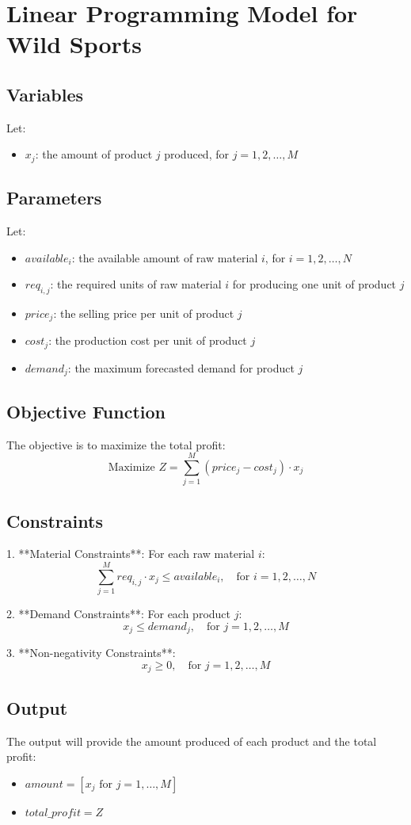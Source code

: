 \documentclass{article}
\begin{document}
\section*{Linear Programming Model for Wild Sports}

\subsection*{Variables}
Let:
\begin{itemize}
    \item \( x_j \): the amount of product \( j \) produced, for \( j = 1, 2, \ldots, M \)
\end{itemize}

\subsection*{Parameters}
Let:
\begin{itemize}
    \item \( available_i \): the available amount of raw material \( i \), for \( i = 1, 2, \ldots, N \)
    \item \( req_{i,j} \): the required units of raw material \( i \) for producing one unit of product \( j \)
    \item \( price_j \): the selling price per unit of product \( j \)
    \item \( cost_j \): the production cost per unit of product \( j \)
    \item \( demand_j \): the maximum forecasted demand for product \( j \)
\end{itemize}

\subsection*{Objective Function}
The objective is to maximize the total profit:
\[
\text{Maximize } Z = \sum_{j=1}^{M} (price_j - cost_j) \cdot x_j
\]

\subsection*{Constraints}
1. **Material Constraints**:
   For each raw material \( i \):
   \[
   \sum_{j=1}^{M} req_{i,j} \cdot x_j \leq available_i, \quad \text{for } i = 1, 2, \ldots, N
   \]

2. **Demand Constraints**:
   For each product \( j \):
   \[
   x_j \leq demand_j, \quad \text{for } j = 1, 2, \ldots, M
   \]

3. **Non-negativity Constraints**:
   \[
   x_j \geq 0, \quad \text{for } j = 1, 2, \ldots, M
   \]

\subsection*{Output}
The output will provide the amount produced of each product and the total profit:
\begin{itemize}
    \item \( amount = [x_j \text{ for } j = 1, \ldots, M] \)
    \item \( total\_profit = Z \)
\end{itemize}
\end{document}
